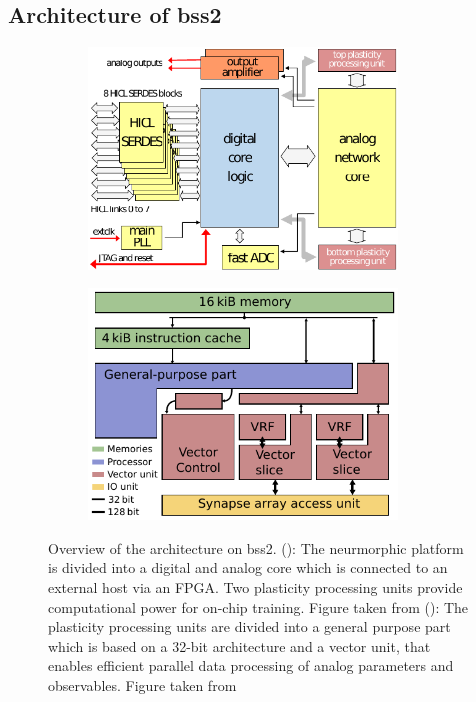 \subsection{Architecture of \gls{bss2}}
\begin{figure}
	\begin{subfigure}[c]{0.5\textwidth}
		\centering
		\caption{}
		\includegraphics[width=0.9\textwidth]{figures/bss2architecture_wtext.pdf}
		\label{hxstructure}
	\end{subfigure}	
	\begin{subfigure}[c]{0.5\textwidth}
		\centering
		\caption{}
		\includegraphics[width=0.9\textwidth]{figures/ppu_overview.pdf}
		\label{hxppu}
	\end{subfigure}
	\caption[Overview of the architecture on \gls{bss2}]{Overview of the architecture on \gls{bss2}. (): The neurmorphic platform is divided into a digital and analog core which is connected to an external host via an FPGA. Two plasticity processing units provide computational power for on-chip training.  Figure taken from \citealp{schemmel2017internal} (): The plasticity processing units are divided into a general purpose part which is based on a 32-bit architecture and a vector unit, that enables efficient parallel data processing of analog parameters and observables. Figure taken from \citealp{friedmann2016hybridlearning}}
\end{figure}

